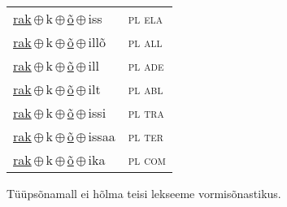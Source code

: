 \begin{minipage}{\textwidth}
\begin{sideways}
\begin{tabular}{l l}
\underline{rak}\,$\oplus$\,k\,$\oplus$\,\underline{õ}\,$\oplus$\,iss & \textsc{ pl ela } \\
\underline{rak}\,$\oplus$\,k\,$\oplus$\,\underline{õ}\,$\oplus$\,illõ & \textsc{ pl all } \\
\underline{rak}\,$\oplus$\,k\,$\oplus$\,\underline{õ}\,$\oplus$\,ill & \textsc{ pl ade } \\
\underline{rak}\,$\oplus$\,k\,$\oplus$\,\underline{õ}\,$\oplus$\,ilt & \textsc{ pl abl } \\
\underline{rak}\,$\oplus$\,k\,$\oplus$\,\underline{õ}\,$\oplus$\,issi & \textsc{ pl tra } \\
\underline{rak}\,$\oplus$\,k\,$\oplus$\,\underline{õ}\,$\oplus$\,issaa & \textsc{ pl ter } \\
\underline{rak}\,$\oplus$\,k\,$\oplus$\,\underline{õ}\,$\oplus$\,ika & \textsc{ pl com } \\
\end{tabular}
\end{sideways}
\label{tab:tüüpsõnamall-rakõ}

\end{minipage}

 
\vspace{1em}
\noindent Tüüpsõnamall  ei hõlma teisi lekseeme vormi\-sõnastikus.
